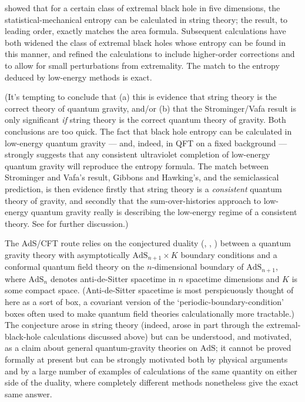\documentclass[12pt]{article}
\newcommand{\AdS}{\mbox{AdS}}
\begin{document}
 showed that for a certain class of extremal black hole in five dimensions, the statistical-mechanical entropy can be calculated in string theory; the result, to leading order, exactly matches the area formula. Subsequent calculations have both widened the class of extremal black holes whose entropy can be found in this manner, and refined the calculations to include higher-order corrections and to allow for small perturbations from extremality. The match to the entropy deduced by low-energy methods is exact.

(It's tempting to conclude that (a) this is evidence that string theory is the correct theory of quantum gravity, and/or (b) that the Strominger/Vafa result is only significant \emph{if} string theory is the correct quantum theory of gravity. Both conclusions are too quick. The fact that black hole entropy can be calculated in low-energy quantum gravity --- and, indeed, in QFT on a fixed background --- strongly suggests that any consistent ultraviolet completion of low-energy quantum gravity will reproduce the entropy formula. The match between Strominger and Vafa's result, Gibbons and Hawking's, and the semiclassical prediction, is then evidence firstly that string theory is a \emph{consistent} quantum theory of gravity, and secondly that the sum-over-histories approach to low-energy quantum gravity really is describing the low-energy regime of a consistent theory. See  for further discussion.)

The AdS/CFT route relies on the conjectured duality (, , ) between a quantum gravity theory with asymptotically $\AdS_{n+1}\times K$ boundary conditions and a conformal quantum field theory on the $n$-dimensional boundary of $\AdS_{n+1}$, where $\AdS_{n}$ denotes anti-de-Sitter spacetime in $n$ spacetime dimensions and $K$ is some compact space. (Anti-de-Sitter spacetime is most perspicuously thought of here as a sort of box, a covariant version of the `periodic-boundary-condition' boxes often used to make quantum field theories calculationally more tractable.) The conjecture arose in string theory (indeed, arose in part through the extremal-black-hole calculations discussed above) but can be understood, and motivated, as a claim about general quantum-gravity theories on $\AdS$; it cannot be proved formally at present but can be strongly motivated both by physical arguments and by a large number of examples of calculations of the same quantity on either side of the duality, where completely different methods nonetheless give the exact same answer. 
\end{document}
